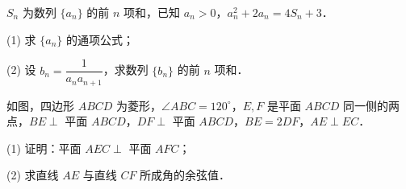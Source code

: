 \begin{question}
$S_n$ 为数列 $\{a_n\}$ 的前 $n$ 项和，已知 $a_n>0$，$a_n^2+2a_n=4S_n+3$．

(1) 求 $\{a_n\}$ 的通项公式；

(2) 设 $b_n=\dfrac1{a_na_{n+1}}$，求数列 $\{b_n\}$ 的前 $n$ 项和．

\Needspace{0.4\textheight}
\end{question}
\begin{question}
如图，四边形 $ABCD$ 为菱形，$\angle ABC=120^\circ$，$E,F$ 是平面 $ABCD$ 同一侧的两点，$BE\perp$ 平面 $ABCD$，$DF\perp$ 平面 $ABCD$，$BE=2DF$，$AE\perp EC$．
\nopagebreak[4]
\begin{center}\end{center}
\nopagebreak[4]
(1) 证明：平面 $AEC\perp$ 平面 $AFC$；

(2) 求直线 $AE$ 与直线 $CF$ 所成角的余弦值．

\Needspace{0.4\textheight}
\end{question}
